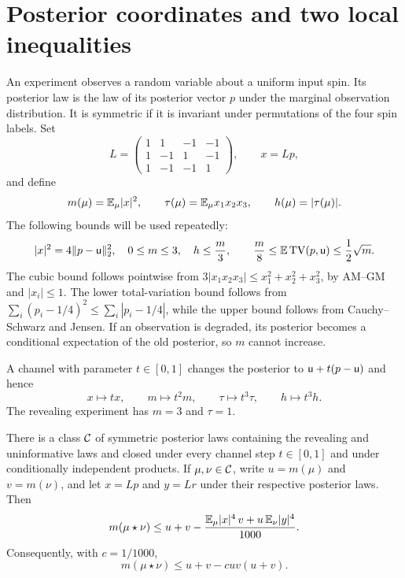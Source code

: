 \section{Posterior coordinates and two local inequalities}

An experiment observes a random variable about a uniform input spin.
Its posterior law is the law of its posterior vector $p$ under the marginal
observation distribution. It is symmetric if it is invariant under
permutations of the four spin labels. Set
\[
L=\begin{pmatrix}
1&1&-1&-1\\
1&-1&1&-1\\
1&-1&-1&1
\end{pmatrix},\qquad x=Lp,
\]
and define
\begin{equation}\label{eq:statistics}
m(\mu)=\mathbb E_\mu|x|^2,\qquad
\tau(\mu)=\mathbb E_\mu x_1x_2x_3,\qquad h(\mu)=|\tau(\mu)|.
\end{equation}
The following bounds will be used repeatedly:
\begin{equation}\label{eq:bounds}
|x|^2=4\|p-\mathsf u\|_2^2,\quad 0\le m\le3,\quad h\le \frac m3,
\qquad \frac m8\le\mathbb E\operatorname{TV}(p,\mathsf u)\le\frac12\sqrt m.
\end{equation}
The cubic bound follows pointwise from
$3|x_1x_2x_3|\le x_1^2+x_2^2+x_3^2$, by AM--GM and $|x_i|\le1$.
The lower total-variation bound follows from
$\sum_i(p_i-1/4)^2\le\sum_i|p_i-1/4|$, while the upper bound follows from
Cauchy--Schwarz and Jensen. If an observation is degraded, its posterior
becomes a conditional expectation of the old posterior, so $m$ cannot
increase.

A channel with parameter $t\in[0,1]$ changes the posterior to
$\mathsf u+t(p-\mathsf u)$ and hence
\begin{equation}\label{eq:scaling}
x\mapsto tx,\qquad m\mapsto t^2m,\qquad
\tau\mapsto t^3\tau,\qquad h\mapsto t^3h.
\end{equation}
The revealing experiment has $m=3$ and $\tau=1$.

\begin{proposition}\label{prop:input}
There is a class $\mathcal C$ of symmetric posterior laws containing the
revealing and uninformative laws and closed under every channel step
$t\in[0,1]$ and under conditionally independent products. If
$\mu,\nu\in\mathcal C$, write $u=m(\mu)$ and $v=m(\nu)$, and let $x=Lp$ and
$y=Lr$ under their respective posterior laws. Then
\begin{equation}\label{eq:input-strong}
 m(\mu\star\nu)
 \le u+v-\frac{\mathbb E_\mu|x|^4\,v+u\,\mathbb E_\nu|y|^4}{1000}.
\end{equation}
Consequently, with $c=1/1000$,
\begin{equation}\label{eq:input}
 m(\mu\star\nu)\le u+v-cuv(u+v).
\end{equation}
\end{proposition}

